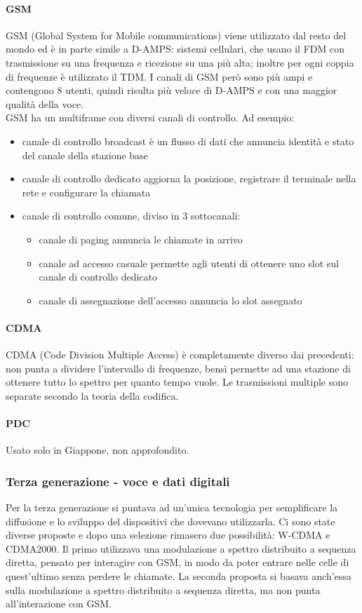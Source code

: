 \paragraph{GSM}
GSM (Global System for Mobile communications) viene utilizzato dal resto del mondo ed è in parte simile a D-AMPS:
sistemi cellulari, che usano il FDM con trasmissione su una frequenza e ricezione su una più alta;
inoltre per ogni coppia di frequenze è utilizzato il TDM.
I canali di GSM però sono più ampi e contengono 8 utenti, quindi risulta più veloce di D-AMPS e con una maggior qualità della voce.\\
GSM ha un multiframe con diversi canali di controllo. Ad esempio:
\begin{itemize}
\item canale di controllo broadcast è un flusso di dati che annuncia identità e stato del canale della stazione base
\item canale di controllo dedicato aggiorna la posizione, registrare il terminale nella rete e configurare la chiamata
\item canale di controllo comune, diviso in 3 sottocanali:
\begin{itemize}
\item canale di paging annuncia le chiamate in arrivo
\item canale ad accesso casuale permette agli utenti di ottenere uno slot sul canale di controllo dedicato
\item canale di assegnazione dell'accesso annuncia lo slot assegnato
\end{itemize}
\end{itemize}

\paragraph{CDMA}
CDMA (Code Division Multiple Access) è completamente diverso dai precedenti: 
non punta a dividere l'intervallo di frequenze, bensì permette ad una stazione di ottenere tutto lo spettro per quanto tempo vuole.
Le trasmissioni multiple sono separate secondo la teoria della codifica.



\paragraph{PDC}
Usato solo in Giappone, non approfondito.

\subsubsection{Terza generazione - voce e dati digitali}
Per la terza generazione si puntava ad un'unica tecnologia per semplificare la diffusione e lo sviluppo del dispositivi che dovevano utilizzarla.
Ci sono state diverse proposte e dopo una selezione rimasero due possibilità: W-CDMA e CDMA2000.
Il primo utilizzava una modulazione a spettro distribuito a sequenza diretta, pensato per interagire con GSM, in modo da poter entrare nelle celle di quest'ultimo senza perdere le chiamate.
La seconda proposta si basava anch'essa sulla modulazione a spettro distribuito a sequenza diretta, ma non punta all'interazione con GSM. 

